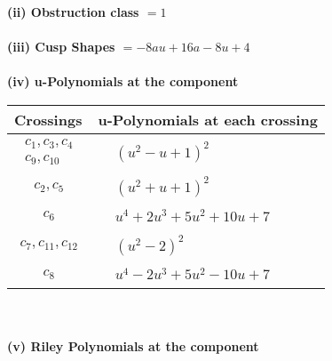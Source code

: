 \documentclass[1p]{elsarticle_modified}
\theoremstyle{definition}
\begin{document}
\flushleft \textbf{(ii) Obstruction class $= 1$}\\~\\
\flushleft \textbf{(iii) Cusp Shapes $= -8 a u+16 a-8 u+4$}\\~\\
\newpage\renewcommand{\arraystretch}{1}
\flushleft \textbf{(iv) u-Polynomials at the component}\newline \\
\begin{tabular}{m{50pt}|m{274pt}}
Crossings & \hspace{64pt}u-Polynomials at each crossing \\
\hline $$\begin{aligned}c_{1},c_{3},c_{4}\\c_{9},c_{10}\end{aligned}$$&$\begin{aligned}
&(u^2- u+1)^2
\end{aligned}$\\
\hline $$\begin{aligned}c_{2},c_{5}\end{aligned}$$&$\begin{aligned}
&(u^2+u+1)^2
\end{aligned}$\\
\hline $$\begin{aligned}c_{6}\end{aligned}$$&$\begin{aligned}
&u^4+2 u^3+5 u^2+10 u+7
\end{aligned}$\\
\hline $$\begin{aligned}c_{7},c_{11},c_{12}\end{aligned}$$&$\begin{aligned}
&(u^2-2)^2
\end{aligned}$\\
\hline $$\begin{aligned}c_{8}\end{aligned}$$&$\begin{aligned}
&u^4-2 u^3+5 u^2-10 u+7
\end{aligned}$\\
\hline
\end{tabular}\\~\\
\newpage\renewcommand{\arraystretch}{1}
\flushleft \textbf{(v) Riley Polynomials at the component}\newline \\
\end{document}
